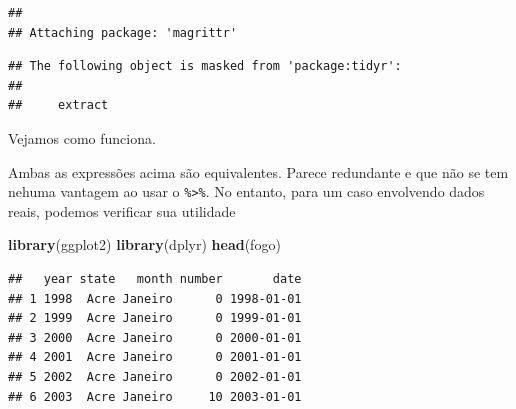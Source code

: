 \documentclass[
]{book}
\newenvironment{Shaded}{\begin{snugshade}}{\end{snugshade}}
\newcommand{\DataTypeTok}[1]{\textcolor[rgb]{0.13,0.29,0.53}{#1}}
\newcommand{\KeywordTok}[1]{\textcolor[rgb]{0.13,0.29,0.53}{\textbf{#1}}}
\newcommand{\NormalTok}[1]{#1}
\newcommand{\OperatorTok}[1]{\textcolor[rgb]{0.81,0.36,0.00}{\textbf{#1}}}
\newcommand{\StringTok}[1]{\textcolor[rgb]{0.31,0.60,0.02}{#1}}
\theoremstyle{definition}
\theoremstyle{definition}
\theoremstyle{definition}
\theoremstyle{remark}
\begin{document}
\begin{verbatim}
## 
## Attaching package: 'magrittr'
\end{verbatim}

\begin{verbatim}
## The following object is masked from 'package:tidyr':
## 
##     extract
\end{verbatim}

Vejamos como funciona.

\begin{Shaded}
\end{Shaded}

Ambas as expressões acima são equivalentes. Parece redundante e que não se tem nehuma vantagem ao usar o \texttt{\%\textgreater{}\%}. No entanto, para um caso envolvendo dados reais, podemos verificar sua utilidade

\begin{Shaded}
\begin{Highlighting}[]
\KeywordTok{library}\NormalTok{(ggplot2)}
\KeywordTok{library}\NormalTok{(dplyr)}
\KeywordTok{head}\NormalTok{(fogo)}
\end{Highlighting}
\end{Shaded}

\begin{verbatim}
##   year state   month number       date
## 1 1998  Acre Janeiro      0 1998-01-01
## 2 1999  Acre Janeiro      0 1999-01-01
## 3 2000  Acre Janeiro      0 2000-01-01
## 4 2001  Acre Janeiro      0 2001-01-01
## 5 2002  Acre Janeiro      0 2002-01-01
## 6 2003  Acre Janeiro     10 2003-01-01
\end{verbatim}

\begin{Shaded}
\end{Shaded}
\end{document}
